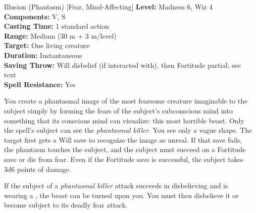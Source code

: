 {Illusion (Phantasm) [Fear, Mind-Affecting]}
{
	\textbf{Level:}
	Madness 6, Wiz 4\\
	\textbf{Components:}
	V, S\\
	\textbf{Casting Time:}
	1 standard action\\
	\textbf{Range:}
	Medium (30 m + 3 m/level)\\
	\textbf{Target:}
	One living creature\\
	\textbf{Duration:}
	Instantaneous\\
	\textbf{Saving Throw:}
	Will disbelief (if interacted with), then Fortitude partial; see text\\
	\textbf{Spell Resistance:}
	Yes\\
}
{
	You create a phantasmal image of the most fearsome creature imaginable to the subject simply by forming the fears of the subject's subconscious mind into something that its conscious mind can visualize: this most horrible beast. Only the spell's subject can see the \emph{phantasmal killer}. You see only a vague shape. The target first gets a Will save to recognize the image as unreal. If that save fails, the phantasm touches the subject, and the subject must succeed on a Fortitude save or die from fear. Even if the Fortitude save is successful, the subject takes 3d6 points of damage.

	If the subject of a \emph{phantasmal killer} attack succeeds in disbelieving and is wearing a , the beast can be turned upon you. You must then disbelieve it or become subject to its deadly fear attack.

}
